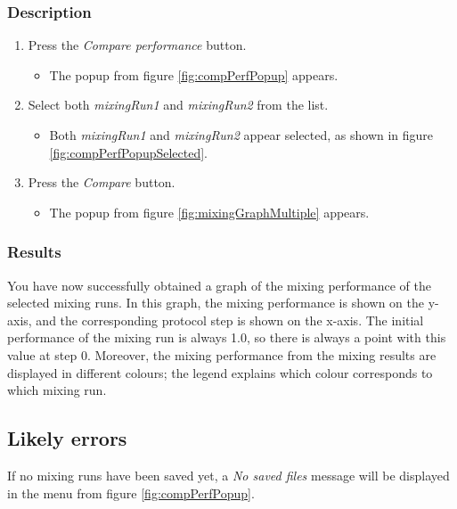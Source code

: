 \subsubsection{Description}\label{subsubsec:viewmultgraphDesc}
\begin{enumerate}
	\item Press the \emph{Compare performance} button.
		\begin{itemize}
			\item The popup from figure \ref{fig:compPerfPopup} appears.
		\end{itemize}
	\item Select both \emph{mixingRun1} and \emph{mixingRun2} from the list. \label{item:viewmultgraphSelect}
		\begin{itemize}
			\item Both \emph{mixingRun1} and \emph{mixingRun2} appear selected, as shown in figure 		\ref{fig:compPerfPopupSelected}.
		\end{itemize}
	\item Press the \emph{Compare} button.
		\begin{itemize}
			\item The popup from figure \ref{fig:mixingGraphMultiple} appears.
		\end{itemize}
\end{enumerate}

\subsubsection{Results}
You have now successfully obtained a graph of the mixing performance of the selected mixing runs. In this graph, the mixing performance is shown on the y-axis, and the corresponding protocol step is shown on the x-axis. The initial performance of the mixing run is always 1.0, so there is always a point with this value at step 0. Moreover, the mixing performance from the mixing results are displayed in different colours; the legend explains which colour corresponds to which mixing run.

\subsection{Likely errors}
If no mixing runs have been saved yet, a \emph{No saved files} message will be displayed in the menu from figure \ref{fig:compPerfPopup}.

